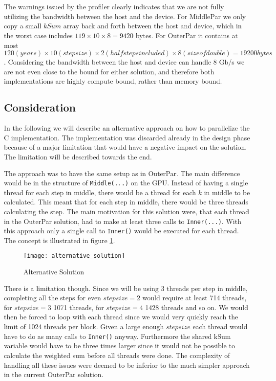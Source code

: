 \\ \\
The warnings issued by the profiler clearly indicates that we are not fully utilizing the bandwidth between the host and the device. For MiddlePar we only copy a small $kSum$ array back and forth between the host and device, which in the worst case includes $119 \times 10 \times 8 = 9420$ bytes. For OuterPar it contains at most $120(years) \times 10(stepsize) \times 2(half steps included) \times 8(size of double) = 19200 bytes$. Considering the bandwidth between the host and device can handle 8 Gb/s we are not even close to the bound for either solution, and therefore both implementations are highly compute bound, rather than memory bound.

\subsection{Consideration}
In the following we will describe an alternative approach on how to parallelize the C implementation. The implementation was discarded already in the design phase because of a major limitation that would have a negative impact on the solution. The limitation will be described towards the end.

The approach was to have the same setup as in OuterPar. The main difference would be in the structure of \texttt{Middle(...)} on the GPU. Instead of having a single thread for each step in middle, there would be a thread for each $k$ in middle to be calculated. This meant that for each step in middle, there would be three threads calculating the step. The main motivation for this solution were, that each thread in the OuterPar solution, had to make at least three calls to \texttt{Inner(...)}. With this approach only a single call to \texttt{Inner()} would be executed for each thread. The concept is illustrated in figure \ref{fig:alternative}.

\begin{figure}[ht!]
  \centering
    \texttt{[image: alternative\_solution]}
  \caption{Alternative Solution}
  \label{fig:alternative}
\end{figure}

There is a limitation though. Since we will be using 3 threads per step in middle, completing all the steps for even $stepsize = 2$ would require at least 714 threads, for $stepsize = 3$ 1071 threads, for $stepsize = 4$ 1428 threads and so on. We would then be forced to loop with each thread since we would very quickly reach the limit of 1024 threads per block. Given a large enough $stepsize$ each thread would have to do as many calls to \texttt{Inner()} anyway. Furthermore the shared kSum variable would have to be three times larger since it would not be possible to calculate the weighted sum before all threads were done. The complexity of handling all these issues were deemed to be inferior to the much simpler approach in the current OuterPar solution.